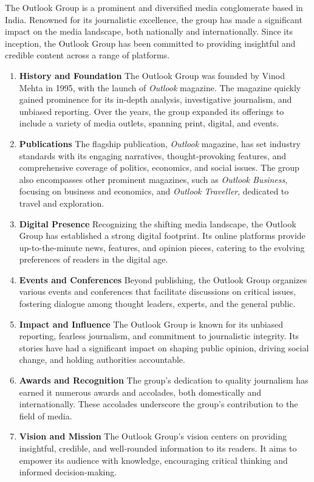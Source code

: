 The Outlook Group is a prominent and diversified media conglomerate based in India. Renowned for its journalistic excellence, the group has made a significant impact on the media landscape, both nationally and internationally. Since its inception, the Outlook Group has been committed to providing insightful and credible content across a range of platforms.\citep{Whichbus35:online}

\begin{enumerate}

\item \textbf{History and Foundation}
The Outlook Group was founded by Vinod Mehta in 1995, with the launch of \textit{Outlook} magazine. The magazine quickly gained prominence for its in-depth analysis, investigative journalism, and unbiased reporting. Over the years, the group expanded its offerings to include a variety of media outlets, spanning print, digital, and events.

\item \textbf{Publications}
The flagship publication, \textit{Outlook} magazine, has set industry standards with its engaging narratives, thought-provoking features, and comprehensive coverage of politics, economics, and social issues. The group also encompasses other prominent magazines, such as \textit{Outlook Business}, focusing on business and economics, and \textit{Outlook Traveller}, dedicated to travel and exploration.

\item \textbf{Digital Presence}
Recognizing the shifting media landscape, the Outlook Group has established a strong digital footprint. Its online platforms provide up-to-the-minute news, features, and opinion pieces, catering to the evolving preferences of readers in the digital age.

\item \textbf{Events and Conferences}
Beyond publishing, the Outlook Group organizes various events and conferences that facilitate discussions on critical issues, fostering dialogue among thought leaders, experts, and the general public.

\item \textbf{Impact and Influence}
The Outlook Group is known for its unbiased reporting, fearless journalism, and commitment to journalistic integrity. Its stories have had a significant impact on shaping public opinion, driving social change, and holding authorities accountable.

\item \textbf{Awards and Recognition}
The group's dedication to quality journalism has earned it numerous awards and accolades, both domestically and internationally. These accolades underscore the group's contribution to the field of media.

\item \textbf{Vision and Mission}
The Outlook Group's vision centers on providing insightful, credible, and well-rounded information to its readers. It aims to empower its audience with knowledge, encouraging critical thinking and informed decision-making.
\end{enumerate}
